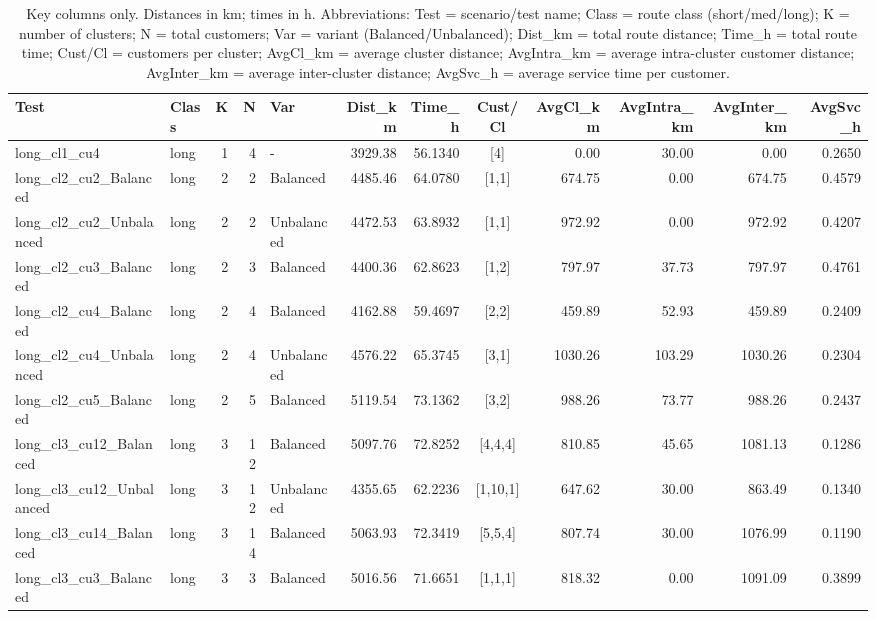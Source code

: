 \documentclass[3p,11pt,authoryear]{elsarticle}  %
\begin{document}
{\scriptsize
\setlength{\tabcolsep}{3pt}

\begin{longtable}{@{}l l r r l r r c r r r r@{}}
\caption{Key columns only. Distances in km; times in h. Abbreviations: Test = scenario/test name; Class = route class (short/med/long); K = number of clusters; N = total customers; Var = variant (Balanced/Unbalanced); Dist\_km = total route distance; Time\_h = total route time; Cust/Cl = customers per cluster; AvgCl\_km = average cluster distance; AvgIntra\_km = average intra-cluster customer distance; AvgInter\_km = average inter-cluster distance; AvgSvc\_h = average service time per customer.}
\label{tab:test_instance_config}\\

\toprule
Test & Class & K & N & Var & Dist\_km & Time\_h & Cust/Cl & AvgCl\_km & AvgIntra\_km & AvgInter\_km & AvgSvc\_h \\
\midrule
long\_cl1\_cu4 & long & 1 & 4 & - & 3929.38 & 56.1340 & [4] & 0.00 & 30.00 & 0.00 & 0.2650 \\
long\_cl2\_cu2\_Balanced & long & 2 & 2 & Balanced & 4485.46 & 64.0780 & [1,1] & 674.75 & 0.00 & 674.75 & 0.4579 \\
long\_cl2\_cu2\_Unbalanced & long & 2 & 2 & Unbalanced & 4472.53 & 63.8932 & [1,1] & 972.92 & 0.00 & 972.92 & 0.4207 \\
long\_cl2\_cu3\_Balanced & long & 2 & 3 & Balanced & 4400.36 & 62.8623 & [1,2] & 797.97 & 37.73 & 797.97 & 0.4761 \\
long\_cl2\_cu4\_Balanced & long & 2 & 4 & Balanced & 4162.88 & 59.4697 & [2,2] & 459.89 & 52.93 & 459.89 & 0.2409 \\
long\_cl2\_cu4\_Unbalanced & long & 2 & 4 & Unbalanced & 4576.22 & 65.3745 & [3,1] & 1030.26 & 103.29 & 1030.26 & 0.2304 \\
long\_cl2\_cu5\_Balanced & long & 2 & 5 & Balanced & 5119.54 & 73.1362 & [3,2] & 988.26 & 73.77 & 988.26 & 0.2437 \\
long\_cl3\_cu12\_Balanced & long & 3 & 12 & Balanced & 5097.76 & 72.8252 & [4,4,4] & 810.85 & 45.65 & 1081.13 & 0.1286 \\
long\_cl3\_cu12\_Unbalanced & long & 3 & 12 & Unbalanced & 4355.65 & 62.2236 & [1,10,1] & 647.62 & 30.00 & 863.49 & 0.1340 \\
long\_cl3\_cu14\_Balanced & long & 3 & 14 & Balanced & 5063.93 & 72.3419 & [5,5,4] & 807.74 & 30.00 & 1076.99 & 0.1190 \\
long\_cl3\_cu3\_Balanced & long & 3 & 3 & Balanced & 5016.56 & 71.6651 & [1,1,1] & 818.32 & 0.00 & 1091.09 & 0.3899 \\

\end{longtable}}
\end{document}

